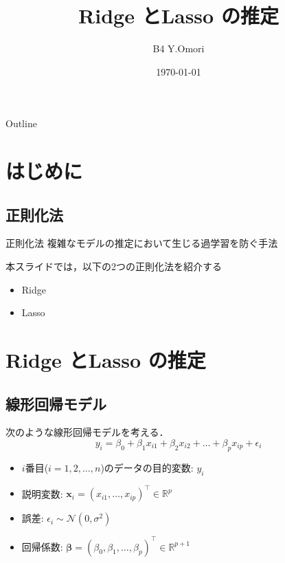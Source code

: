 \documentclass[dvipdfmx, 10pt]{beamer}
\title[]{Ridge とLasso の推定}
\author[Y.Omori]{B4 Y.Omori}
\date[\today]{\today}
\institute[NIT]{Nagoya Institute of Technology \\ Takeuchi \& Karasuyama Lab}
\begin{document}
\begin{frame}{}
\maketitle%
\thispagestyle{empty}%
\addtocounter{framenumber}{-1}%
\end{frame}
\begin{frame}{Outline}
\tableofcontents[hideallsubsections]
\end{frame}

\section{はじめに}
\subsection{正則化法}
\begin{frame}{\insertsubsection}
    \begin{block}{正則化法}
        複雑なモデルの推定において生じる過学習を防ぐ手法
    \end{block}
    \vspace{10pt}
    本スライドでは，以下の2つの正則化法を紹介する
    \begin{itemize}
        \item Ridge
      \item Lasso
    \end{itemize}
\end{frame}

\section{Ridge とLasso の推定}
\subsection{線形回帰モデル}
\begin{frame}{\insertsubsection}
    次のような線形回帰モデルを考える．
    \begin{equation}
    	y_i=\beta_0 + \beta_1 x_{i1} + \beta_2  x_{i2} + \dots + \beta_p x_{ip} + \epsilon_i
    	\label{eq:linear_model_origin}
    \end{equation}    
    \begin{itemize}
        \item $i$番目($i = 1, 2, \dots, n$)のデータの目的変数: $y_i$\\
        \item 説明変数: $\bm{x}_i=(x_{i1}, \dots, x_{ip})^{\top} \in \mathbb{R}^p$\\
        \item 誤差: $\epsilon_i \sim \mathcal{N}(0, \sigma^2)$\\
        \item 回帰係数: $\bm{\beta}=(\beta_0, \beta_1, \dots , \beta_p)^{\top} \in \mathbb{R}^{p+1}$
    \end{itemize}
\end{frame}
\end{document}
